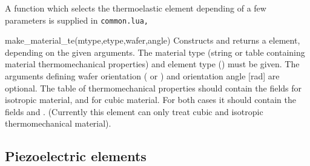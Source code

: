 A function which selects the thermoelastic element depending of a 
few parameters is supplied in \tt{common.lua},
\begin{codelist}
  \item[make\_material\_te(mtype,etype,wafer,angle)]
    Constructs and returns a  element, depending on the
    given arguments. The material type  (string or table containing
    material thermomechanical properties) and element type
    () must be given. 
    The arguments defining wafer orientation ( or
    ) and orientation angle  [rad] are optional.
    The table of thermomechanical properties  should contain the 
    fields  for isotropic material, and  for cubic material. For both cases it should contain the fields
     and .
    (Currently this element can only treat cubic and isotropic thermomechanical
     material).
\end{codelist}

\subsection{Piezoelectric elements}

